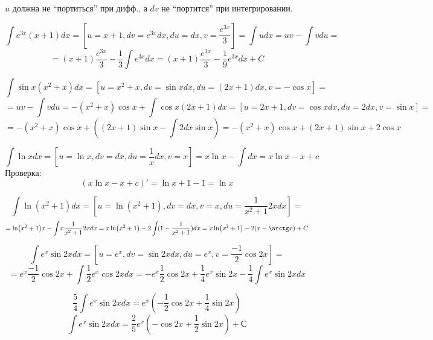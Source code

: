 $u$ должна не ``портиться'' при дифф., а $dv$ не ``портится'' при интегрировании.

$$\int\! e^{3x}(x+1)dx=[u=x+1, dv=e^{3x}dx, du = dx, v = \frac{e^{3x}}{3}]=\int\! udx=uv-\int\! vdu=$$
$$=(x+1)\frac{e^{3x}}{3}-\frac{1}{3}\int\! e^{3x}dx=(x+1)\frac{e^{3x}}{3}-\frac{1}{9} e^{3x}dx + C$$

$$\int\! \sin x(x^2 + x) dx = [u=x^2+x, dv=\sin x dx, du = (2x+1)dx, v=-\cos x]=$$
$$=uv-\int\! vdu = -(x^2+x)\cos x+\int\! \cos x (2x+1)dx=[u=2x+1, dv = \cos x dx, du=2dx, v=\sin x]=$$
$$=-(x^2+x)\cos x + ((2x+1)\sin x - \int\! 2dx\sin x)=-(x^2+x)\cos x + (2x+1)\sin x + 2\cos x$$

$$\int\! \ln x dx=[u=\ln x, dv=dx, du = \frac{1}{x}dx, v=x]=x\ln x -\int\! dx=x\ln x - x + c$$
Проверка:
$$(x\ln x - x + c)'=\ln x + 1 - 1=\ln x$$

$$\int\! \ln(x^2+1) dx = [u=\ln (x^2+1), dv=dx, v=x, du=\frac{1}{x^2+1}2xdx]=$$
$$=\ln(x^2+1)x - \int\! x \frac{1}{x^2+1}2xdx=x\ln(x^2+1)-2\int\! (1-\frac{1}{x^2+1})dx=x\ln(x^2+1)-2(x-\arctg x)+C$$

$$\int\! e^x\sin 2x dx=[u=e^x, dv=\sin 2x dx, du = e^x, v=\frac{-1}{2}\cos 2x]=$$
$$=e^x\frac{-1}{2}\cos 2x + \int\! \frac{1}{2} e^x\cos 2xdx=-e^x\frac{1}{2}\cos 2x + \frac{1}{4}e^x\sin 2x -\frac{1}{4}\int\! e^x\sin 2x dx$$

$$\frac{5}{4}\int\! e^x\sin 2x dx=e^x\left(-\frac{1}{2}\cos 2x + \frac{1}{4} \sin 2x \right)$$
$$\int\! e^x\sin 2x dx=\frac{2}{5}e^x\left(-\cos 2x + \frac{1}{2} \sin 2x \right)+С$$

